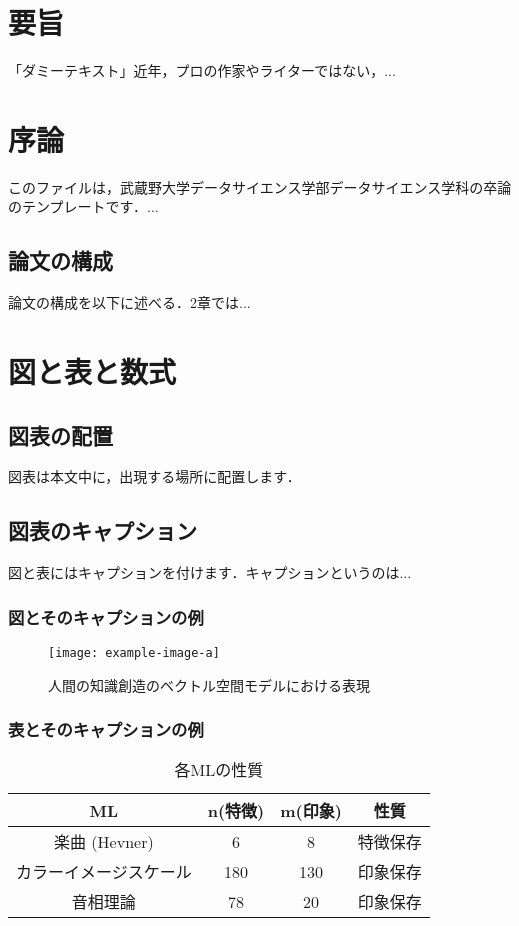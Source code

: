 \documentclass[titlepage,12pt]{ltjsarticle}
\title{卒業論文 \vskip\baselineskip タイトルタイトルタイトル}
\author{武蔵野太郎\\ データサイエンス学科\\ 武蔵野大学}
\date{2025年1月}
\begin{document}
\maketitle

\section*{要旨}
「ダミーテキスト」近年，プロの作家やライターではない，...

\clearpage
\tableofcontents

\section{序論}
このファイルは，武蔵野大学データサイエンス学部データサイエンス学科の卒論のテンプレートです．...

\subsection{論文の構成}
論文の構成を以下に述べる．2章では...

\section{図と表と数式}
\subsection{図表の配置}
図表は本文中に，出現する場所に配置します．

\subsection{図表のキャプション}
図と表にはキャプションを付けます．キャプションというのは...

\subsubsection{図とそのキャプションの例}
\begin{figure}[htbp]
    \centering
    \texttt{[image: example-image-a]}
    \caption{人間の知識創造のベクトル空間モデルにおける表現}
\end{figure}

\subsubsection{表とそのキャプションの例}
\begin{table}[htbp]
    \centering
    \begin{tabular}{|c|c|c|c|}
        \hline
        ML & n(特徴) & m(印象) & 性質 \\ \hline
        楽曲 (Hevner) & 6 & 8 & 特徴保存 \\ \hline
        カラーイメージスケール & 180 & 130 & 印象保存 \\ \hline
        音相理論 & 78 & 20 & 印象保存 \\ \hline
    \end{tabular}
    \caption{各MLの性質}
\end{table}
\end{document}

